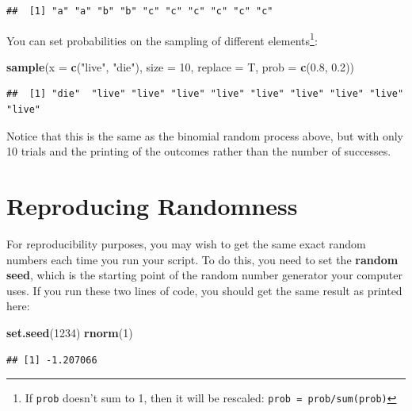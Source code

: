 \documentclass[]{book}
\newenvironment{Shaded}{\begin{snugshade}}{\end{snugshade}}
\newcommand{\KeywordTok}[1]{\textcolor[rgb]{0.13,0.29,0.53}{\textbf{#1}}}
\newcommand{\DataTypeTok}[1]{\textcolor[rgb]{0.13,0.29,0.53}{#1}}
\newcommand{\DecValTok}[1]{\textcolor[rgb]{0.00,0.00,0.81}{#1}}
\newcommand{\FloatTok}[1]{\textcolor[rgb]{0.00,0.00,0.81}{#1}}
\newcommand{\StringTok}[1]{\textcolor[rgb]{0.31,0.60,0.02}{#1}}
\newcommand{\NormalTok}[1]{#1}
\let\rmarkdownfootnote\footnote%
\def\footnote{\protect\rmarkdownfootnote}
\theoremstyle{definition}
\theoremstyle{definition}
\theoremstyle{definition}
\theoremstyle{remark}
\begin{document}
\begin{verbatim}
##  [1] "a" "a" "b" "b" "c" "c" "c" "c" "c" "c"
\end{verbatim}

You can set probabilities on the sampling of different
elements\footnote{If \texttt{prob} doesn't sum to 1, then it will be
  rescaled: \texttt{prob\ =\ prob/sum(prob)}}:

\begin{Shaded}
\begin{Highlighting}[]
\KeywordTok{sample}\NormalTok{(}\DataTypeTok{x =} \KeywordTok{c}\NormalTok{(}\StringTok{"live"}\NormalTok{, }\StringTok{"die"}\NormalTok{), }\DataTypeTok{size =} \DecValTok{10}\NormalTok{, }\DataTypeTok{replace =}\NormalTok{ T,}
       \DataTypeTok{prob =} \KeywordTok{c}\NormalTok{(}\FloatTok{0.8}\NormalTok{, }\FloatTok{0.2}\NormalTok{))}
\end{Highlighting}
\end{Shaded}

\begin{verbatim}
##  [1] "die"  "live" "live" "live" "live" "live" "live" "live" "live" "live"
\end{verbatim}

Notice that this is the same as the binomial random process above, but
with only 10 trials and the printing of the outcomes rather than the
number of successes.

\section{Reproducing Randomness}\label{reproducing-randomness}

For reproducibility purposes, you may wish to get the same exact random
numbers each time you run your script. To do this, you need to set the
\textbf{random seed}, which is the starting point of the random number
generator your computer uses. If you run these two lines of code, you
should get the same result as printed here:

\begin{Shaded}
\begin{Highlighting}[]
\KeywordTok{set.seed}\NormalTok{(}\DecValTok{1234}\NormalTok{)}
\KeywordTok{rnorm}\NormalTok{(}\DecValTok{1}\NormalTok{)}
\end{Highlighting}
\end{Shaded}

\begin{verbatim}
## [1] -1.207066
\end{verbatim}
\end{document}
